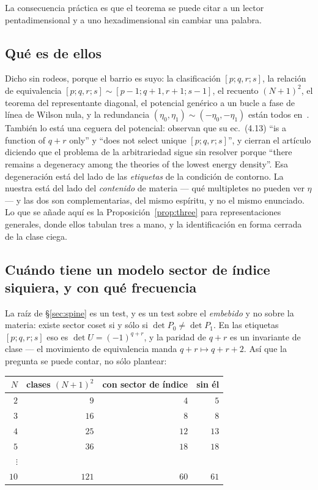 \documentclass[11pt,a4paper]{article}
\newcommand{\Dl}{D_\lambda}
\begin{document}
\noindent [Verificado sobre las $455$ irreducibles en rango: $0$ tienen coeficientes de ambos signos;
$\Dl(1)=0$ en $47$ y $\Dl\equiv0$ en las mismas $47$, con $0$ en una clase y no en la otra.]

La consecuencia práctica es que el teorema se puede citar a un lector pentadimensional y a uno
hexadimensional sin cambiar una palabra.

\subsection*{Qué es de ellos}

Dicho sin rodeos, porque el barrio es suyo: la clasificación $[p;q,r;s]$, la relación de equivalencia
$[p;q,r;s]\sim[p-1;q+1,r+1;s-1]$, el recuento $(N+1)^2$, el teorema del representante diagonal, el
potencial genérico a un bucle a fase de línea de Wilson nula, y la redundancia
$(\eta_0,\eta_1)\sim(-\eta_0,-\eta_1)$ están todos en~\cite{HHK}. También lo está una ceguera del
potencial: observan que su ec.~(4.13) ``is a function of $q+r$ only'' y ``does not select unique
$[p;q,r;s]$'', y cierran el artículo diciendo que el problema de la arbitrariedad sigue sin resolver
porque ``there remains a degeneracy among the theories of the lowest energy density''. Esa
degeneración está del lado de las \emph{etiquetas} de la condición de contorno. La nuestra está del
lado del \emph{contenido} de materia --- qué multipletes no pueden ver $\eta$ --- y las dos son
complementarias, del mismo espíritu, y no el mismo enunciado. Lo que se añade aquí es la
Proposición~\ref{prop:three} para representaciones generales, donde ellos tabulan tres a mano, y la
identificación en forma cerrada de la clase ciega.

\subsection*{Cuándo tiene un modelo sector de índice siquiera, y con qué frecuencia}

La raíz de \S\ref{sec:spine} es un test, y es un test sobre el \emph{embebido} y no sobre la materia:
existe sector coset si y sólo si $\det P_0\neq\det P_1$. En las etiquetas $[p;q,r;s]$ eso es
$\det U=(-1)^{q+r}$, y la paridad de $q+r$ es un invariante de clase --- el movimiento de
equivalencia manda $q+r\mapsto q+r+2$. Así que la pregunta se puede
contar, no sólo plantear:

\begin{center}\small
{}
\begin{tabular}{rrrr}
\toprule
\rowcolor{hdrblue!14}$N$ & clases $(N+1)^2$ & con sector de índice & sin él\\
\midrule
$2$ & $9$ & $4$ & $5$\\
$3$ & $16$ & $8$ & $8$\\
$4$ & $25$ & $12$ & $13$\\
$5$ & $36$ & $18$ & $18$\\
$\vdots$ & & & \\
$10$ & $121$ & $60$ & $61$\\
\bottomrule
\end{tabular}
\end{center}
\end{document}
